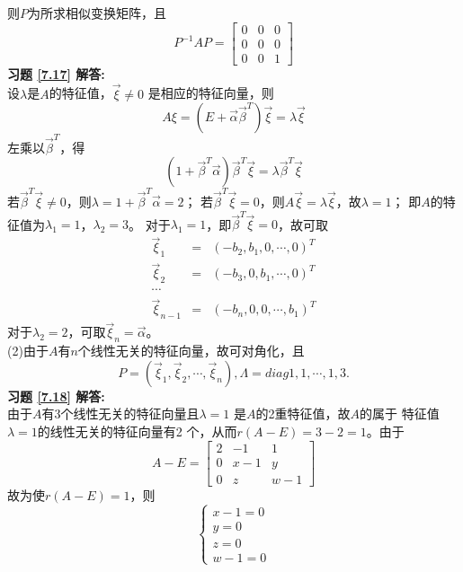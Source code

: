 则$P$为所求相似变换矩阵，且
\begin{equation*}
 P^{-1}AP=\begin{bmatrix}0&0&0\\0&0&0\\0&0&1\end{bmatrix}
\end{equation*}
\textbf{习题 \ref{7.17} 解答:}\\
设$\lambda$是$A$的特征值，$\vec{\xi}\neq0$ 是相应的特征向量，则
\begin{equation*}
A\xi=(E+\vec{\alpha}\vec{\beta}^T)\vec{\xi}=\lambda\vec{\xi}
\end{equation*}
左乘以$\vec{\beta}^T$，得
\begin{equation*}
(1+\vec{\beta}^T\vec{\alpha})\vec{\beta}^T\vec{\xi}=\lambda\vec{\beta}^T\vec{\xi}
\end{equation*}
若$\vec{\beta}^T\vec{\xi}\neq0$，则$\lambda=1+\vec{\beta}^T\vec{\alpha}=2$；
若$\vec{\beta}^T\vec{\xi}=0$，则$A\vec{\xi}=\lambda\vec{\xi}$，故$\lambda=1$；
即$A$的特征值为$\lambda_1=1$，$\lambda_2=3$。
对于$\lambda_1=1$，即$\vec{\beta}^T\vec{\xi}=0$，故可取
\begin{eqnarray*}
  \vec{\xi}_1&=& (-b_2,b_1,0,\cdots,0)^T \\
  \vec{\xi}_2&=& (-b_3,0,b_1,\cdots,0)^T\\
  \cdots \\
  \vec{\xi}_{n-1} &=& (-b_n,0,0,\cdots,b_1)^T
\end{eqnarray*}
对于$\lambda_2=2$，可取$\vec{\xi}_n=\vec{\alpha}$。\\
(2)由于$A$有$n$个线性无关的特征向量，故可对角化，且
\begin{equation*}
P=(\vec{\xi}_1,\vec{\xi}_2,\cdots,\vec{\xi}_n),\Lambda=diag{1,1,\cdots,1,3}.
\end{equation*}
\textbf{习题 \ref{7.18} 解答:}\\
由于$A$有3个线性无关的特征向量且$\lambda=1$ 是$A$的2重特征值，故$A$的属于
特征值$\lambda=1$的线性无关的特征向量有2 个，从而$r(A-E)=3-2=1$。由于
\begin{equation*}
  A-E=\begin{bmatrix}2&-1&1\\0&x-1&y\\0&z&w-1\end{bmatrix}
\end{equation*}
故为使$r(A-E)=1$，则
\begin{equation*}
 \begin{cases}
 x-1=0\\
 y=0\\
 z=0\\
 w-1=0
 \end{cases}
\end{equation*}
